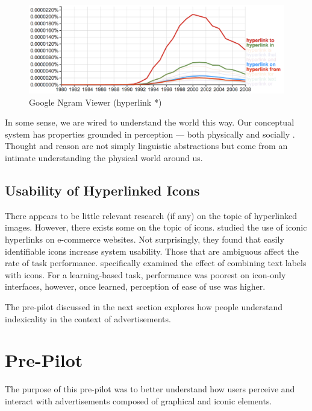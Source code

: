 \begin{figure}
\centerline{
  \includegraphics[scale=.25]{chapter6.tex/ngram2}
  }
\caption{Google Ngram Viewer (hyperlink *)}
\label{ngram-singular}
\end{figure}
\begin{sloppier}
In some sense, we are wired to understand the world this way.  Our conceptual system has properties grounded in perception --- both physically and socially \citep{Lakoff:2008tq}. Thought and reason are not simply linguistic abstractions but come from an intimate understanding the physical world around us.
\end{sloppier}


\subsection{Usability of Hyperlinked Icons}
\label{usabilityofhyperlinkedicons}

There appears to be little relevant research (if any) on the topic of hyperlinked images. However, there exists some on the topic of icons.  \citet*{Cheng:2007eh}  studied the use of iconic hyperlinks on e-commerce websites. Not surprisingly, they found that easily identifiable icons increase system usability. Those that are ambiguous affect the rate of task performance.  \citet*{Wiedenbeck:1999vk}  specifically examined the effect of combining text labels with icons. For a learning-based task, performance was poorest on icon-only interfaces, however, once learned, perception of ease of use was higher.

The pre-pilot discussed in the next section explores how people understand indexicality in the context of advertisements.

\section{Pre-Pilot}
\label{pre-pilot}

The purpose of this pre-pilot was to better understand how users perceive and interact with advertisements composed of graphical and iconic elements. 

